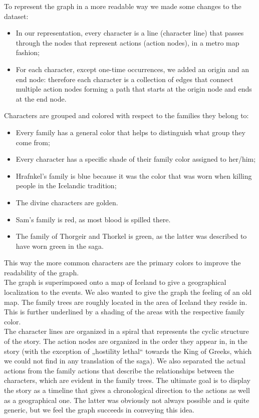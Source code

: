 \documentclass[runningheads]{llncs}
\begin{document}
To represent the graph in a more readable way we made some changes to the dataset:
\begin{itemize}
	\item In our representation, every character is a line (character line) that passes through the nodes that represent actions (action nodes), in a metro map fashion;
	\item For each character, except one-time occurrences, we added an origin and an end node: therefore each character is a collection of edges that connect multiple action nodes forming a path that starts at the origin node and ends at the end node. 
\end{itemize}
Characters are grouped and colored with respect to the families they belong to: 
\begin{itemize}
	\item Every family has a general color that helps to distinguish what group they come from;
	\item Every character has a specific shade of their family color assigned to her/him;
	\item Hrafnkel's family is blue because it was the color that was worn when killing people in the Icelandic tradition; 
	\item The divine characters are golden.
	\item Sam's family is red, as most blood is spilled there.
	\item The family of Thorgeir and Thorkel is green, as the latter was described to have worn green in the saga. 
\end{itemize}
This way the more common characters are the primary colors to improve the readability of the graph. \\
The graph is superimposed onto a map of Iceland to give a geographical localization to the events. We also wanted to give the graph the feeling of an old map. The family trees are roughly located in the area of Iceland they reside in. This is further underlined by a shading of the areas with the respective family color. \\
The character lines are organized in a spiral that represents the cyclic structure of the story.
The action nodes are organized in the order they appear in, in the story (with the exception of „hostility lethal“ towards the King of Greeks, which we could not find in any translation of the saga). We also separated the actual actions from the family actions that describe the relationships between the characters, which are evident in the family trees. The ultimate goal is to display the story as a timeline that gives a chronological direction to the actions as well as a geographical one. The latter was obviously not always possible and is quite generic, but we feel the graph succeeds in conveying this idea. \\
\end{document}
